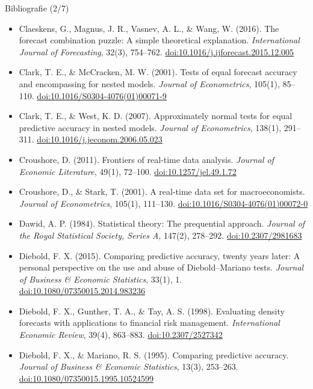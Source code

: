 \begin{frame}{Bibliografie (2/7)}
\itemsize{\tiny}
\begin{itemize}
    \item Claeskens, G., Magnus, J. R., Vasnev, A. L., \& Wang, W. (2016). The forecast combination puzzle: A simple theoretical explanation. \textit{International Journal of Forecasting}, 32(3), 754--762. \href{https://doi.org/10.1016/j.ijforecast.2015.12.005}{doi:10.1016/j.ijforecast.2015.12.005}
    \item Clark, T. E., \& McCracken, M. W. (2001). Tests of equal forecast accuracy and encompassing for nested models. \textit{Journal of Econometrics}, 105(1), 85--110. \href{https://doi.org/10.1016/S0304-4076(01)00071-9}{doi:10.1016/S0304-4076(01)00071-9}
    \item Clark, T. E., \& West, K. D. (2007). Approximately normal tests for equal predictive accuracy in nested models. \textit{Journal of Econometrics}, 138(1), 291--311. \href{https://doi.org/10.1016/j.jeconom.2006.05.023}{doi:10.1016/j.jeconom.2006.05.023}
    \item Croushore, D. (2011). Frontiers of real-time data analysis. \textit{Journal of Economic Literature}, 49(1), 72--100. \href{https://doi.org/10.1257/jel.49.1.72}{doi:10.1257/jel.49.1.72}
    \item Croushore, D., \& Stark, T. (2001). A real-time data set for macroeconomists. \textit{Journal of Econometrics}, 105(1), 111--130. \href{https://doi.org/10.1016/S0304-4076(01)00072-0}{doi:10.1016/S0304-4076(01)00072-0}
    \item Dawid, A. P. (1984). Statistical theory: The prequential approach. \textit{Journal of the Royal Statistical Society, Series A}, 147(2), 278--292. \href{https://doi.org/10.2307/2981683}{doi:10.2307/2981683}
    \item Diebold, F. X. (2015). Comparing predictive accuracy, twenty years later: A personal perspective on the use and abuse of Diebold--Mariano tests. \textit{Journal of Business \& Economic Statistics}, 33(1), 1. \href{https://doi.org/10.1080/07350015.2014.983236}{doi:10.1080/07350015.2014.983236}
    \item Diebold, F. X., Gunther, T. A., \& Tay, A. S. (1998). Evaluating density forecasts with applications to financial risk management. \textit{International Economic Review}, 39(4), 863--883. \href{https://doi.org/10.2307/2527342}{doi:10.2307/2527342}
    \item Diebold, F. X., \& Mariano, R. S. (1995). Comparing predictive accuracy. \textit{Journal of Business \& Economic Statistics}, 13(3), 253--263. \href{https://doi.org/10.1080/07350015.1995.10524599}{doi:10.1080/07350015.1995.10524599}

\end{itemize}
\end{frame}
